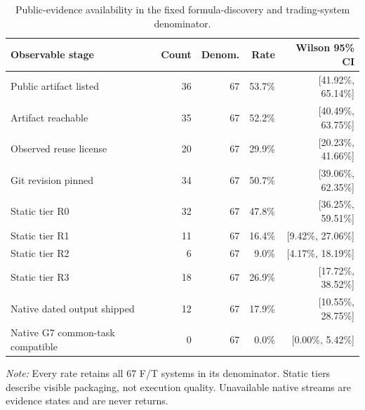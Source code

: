 \begin{table}[H]
\centering
\caption{Public-evidence availability in the fixed formula-discovery and trading-system denominator.}
\label{tab:artifact-summary}
\begingroup
\color{Ink}
\small
\begin{tabular}{lrrrr}
\toprule
\color{Navy}\textbf{Observable stage} & \color{Navy}\textbf{Count} & \color{Navy}\textbf{Denom.} & \color{Navy}\textbf{Rate} & \color{Navy}\textbf{Wilson 95\% CI} \\
\midrule
Public artifact listed & 36 & 67 & 53.7\% & [41.92\%, 65.14\%] \\
Artifact reachable & 35 & 67 & 52.2\% & [40.49\%, 63.75\%] \\
Observed reuse license & 20 & 67 & 29.9\% & [20.23\%, 41.66\%] \\
Git revision pinned & 34 & 67 & 50.7\% & [39.06\%, 62.35\%] \\
Static tier R0 & 32 & 67 & 47.8\% & [36.25\%, 59.51\%] \\
Static tier R1 & 11 & 67 & 16.4\% & [9.42\%, 27.06\%] \\
Static tier R2 & 6 & 67 & 9.0\% & [4.17\%, 18.19\%] \\
Static tier R3 & 18 & 67 & 26.9\% & [17.72\%, 38.52\%] \\
Native dated output shipped & 12 & 67 & 17.9\% & [10.55\%, 28.75\%] \\
Native G7 common-task compatible & 0 & 67 & 0.0\% & [0.00\%, 5.42\%] \\
\bottomrule
\end{tabular}
\par\vspace{0.25em}\footnotesize\color{Ink}\emph{Note:} Every rate retains all 67 F/T systems in its denominator. Static tiers describe visible packaging, not execution quality. Unavailable native streams are evidence states and are never returns.
\endgroup
\end{table}
